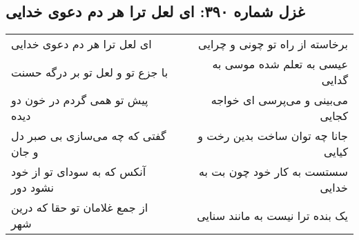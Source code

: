 \begin{center}
\section*{غزل شماره ۳۹۰: ای لعل ترا هر دم دعوی خدایی}
\label{sec:390}
\begin{longtable}{l p{0.5cm} r}
ای لعل ترا هر دم دعوی خدایی
&&
برخاسته از راه تو چونی و چرایی
\\
با جزع تو و لعل تو بر درگه حسنت
&&
عیسی به تعلم شده موسی به گدایی
\\
پیش تو همی گردم در خون دو دیده
&&
می‌بینی و می‌پرسی ای خواجه کجایی
\\
گفتی که چه می‌سازی بی صبر دل و جان
&&
جانا چه توان ساخت بدین رخت و کیایی
\\
آنکس که به سودای تو از خود نشود دور
&&
سستست به کار خود چون بت به خدایی
\\
از جمع غلامان تو حقا که درین شهر
&&
یک بنده ترا نیست به مانند سنایی
\\
\end{longtable}
\end{center}
